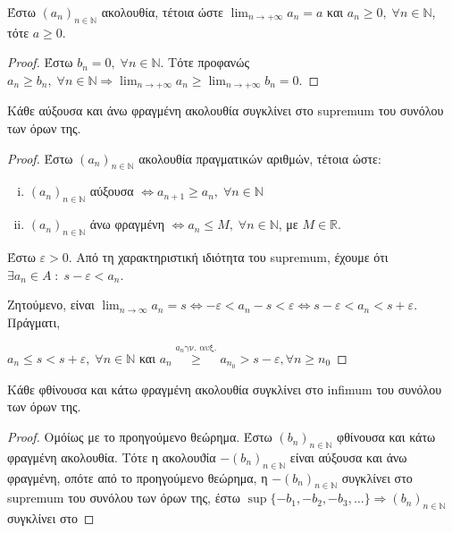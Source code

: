 \documentclass[main.tex]{subfiles}
\begin{document}
\begin{cor}
    Έστω $ (a_{n})_{n \in \mathbb{N}} $ ακολουθία, τέτοια ώστε 
    $ \lim_{n \to +\infty} a_{n} = a$ και $ a_{n} \geq 0, \; \forall 
    n \in \mathbb{N} $, τότε $ a \geq 0 $.
\end{cor}

\begin{proof}
    Έστω $ b_{n} = 0, \; \forall n \in \mathbb{N} $. Τότε προφανώς 
    $ a_{n} \geq b_{n}, \; \forall n
    \in \mathbb{N} \Rightarrow \lim_{n \to +\infty} a_{n} \geq 
    \lim_{n \to +\infty} b_{n} = 0$.
\end{proof}

\begin{thm}
    Κάθε αύξουσα και άνω φραγμένη ακολουθία συγκλίνει στο 
    supremum του συνόλου των όρων της.
\end{thm}

\begin{proof}
    Έστω $ (a_{n})_{n \in \mathbb{N}} $ ακολουθία πραγματικών αριθμών, 
    τέτοια ώστε:
    \begin{enumerate}[i)]
        \item $ (a_{n})_{n \in \mathbb{N}} $ αύξουσα $ \Leftrightarrow 
            a_{n+1} \geq a_{n}, \; \forall n \in \mathbb{N}$ 
        \item $ (a_{n})_{n \in \mathbb{N}} $ άνω  φραγμένη $ 
            \Leftrightarrow a_{n} \leq M, \; \forall n \in 
            \mathbb{N}$, με $ M \in \mathbb{R} $.
    \end{enumerate}

    Έστω $ \varepsilon >0 $. Από τη χαρακτηριστική ιδιότητα του 
    supremum, έχουμε ότι $ \exists a_{n} \in A \; : \; s - \varepsilon 
    < a_{n} $.

    Ζητούμενο, είναι $ \lim_{n \to \infty} a_{n} = s \Leftrightarrow 
    - \varepsilon < a_{n} -s < \varepsilon \Leftrightarrow s - 
    \varepsilon < a_{n} < s + \varepsilon $. Πράγματι, 

    $ a_{n} \leq s < s + \varepsilon, \; \forall n \in \mathbb{N} $ και 
    $ a_{n} \overset{a_{n} \text{γν. αυξ.}}{\geq} a_{n_{0}} > s - 
    \varepsilon, \forall n \geq n_{0} $
\end{proof}

\begin{thm}
    Κάθε φθίνουσα και κάτω φραγμένη ακολουθία συγκλίνει στο infimum του 
    συνόλου των όρων της.
\end{thm}

\begin{proof}
    Ομόίως με το προηγούμενο θεώρημα. Έστω 
    $ (b_{n})_{n \in \mathbb{N}} $ 
    φθίνουσα και κάτω φραγμένη ακολουθία. Τότε η ακολουϑία 
    $ -(b_{n})_{n \in \mathbb{N}} $ είναι αύξουσα και άνω φραγμένη, 
    οπότε από το προηγούμενο θεώρημα, η $ -(b_{n})_{n \in \mathbb{N}} $
    συγκλίνει στο supremum του συνόλου των όρων της, έστω 
    $ \sup \{ - b_{1}, - b_{2}, -b_{3}, \ldots \}
    \Rightarrow (b_{n})_{n \in \mathbb{N}} $ συγκλίνει στο  
\end{proof}
\end{document}
